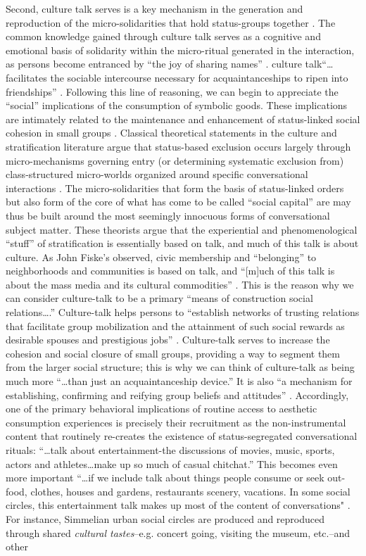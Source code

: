 Second, culture talk serves is a key mechanism in the generation and reproduction of the micro-solidarities that hold status-groups together \citep{ostrower98}.  The common knowledge gained through culture talk serves as a cognitive and emotional basis of solidarity within the micro-ritual generated in the interaction, as persons become entranced by ``the joy of sharing names'' \citep{dimaggio87}. culture talk``\ldots facilitates the sociable intercourse necessary for acquaintanceships to ripen into friendships'' \citep{dimaggio87}.  Following this line of reasoning, we can begin to appreciate the ``social'' implications of the consumption of symbolic goods. These implications are intimately related to the maintenance and enhancement of status-linked social cohesion in small groups \citep{fine77}.  Classical theoretical statements in the culture and stratification literature argue that status-based exclusion occurs largely through micro-mechanisms governing entry (or determining systematic exclusion from) class-structured micro-worlds organized around specific conversational interactions \citep{collins75, collins00}.  The micro-solidarities that form the basis of status-linked orders but also form of the core of what has come to be called ``social capital'' are may thus be built around the most seemingly innocuous forms of conversational subject matter.  These theorists argue that the experiential and phenomenological ``stuff'' of stratification is essentially based on talk, and much of this talk is about culture. As John Fiske's observed, civic membership and ``belonging'' to neighborhoods and communities is based on talk, and ``[m]uch of this talk is about the mass media and its cultural commodities'' \citeyearpar[73]{fiske87}.  This is the reason why we can consider culture-talk to be a primary  ``means of construction social relations\ldots.''  Culture-talk helps persons to ``establish networks of trusting relations that facilitate group mobilization and the attainment of such social rewards as desirable spouses and prestigious jobs''  \citep[443]{dimaggio87}.  Culture-talk serves to increase the cohesion and social closure of small groups, providing a way to segment them from the larger social structure;  this is why we can think of culture-talk as being much more ``\ldots than just an acquaintanceship device.''  It is also ``a mechanism for establishing, confirming and reifying group beliefs and attitudes'' \citep[461]{fine77}.  Accordingly, one of the primary behavioral implications of routine access to aesthetic consumption experiences is precisely their recruitment as the non-instrumental content that routinely re-creates the existence of status-segregated conversational rituals:  ``\ldots talk about entertainment-the discussions of movies, music, sports, actors and athletes\ldots make up so much of casual chitchat.'' This becomes even more important ``\ldots if we include talk about things people consume or seek out-food, clothes, houses and gardens, restaurants scenery, vacations.  In some social circles, this entertainment talk makes up most of the content of conversations" \citep[125]{collins75}. For instance, Simmelian urban social circles are produced and reproduced through shared \emph{cultural tastes}--e.g. concert going, visiting the museum, etc.--and other 